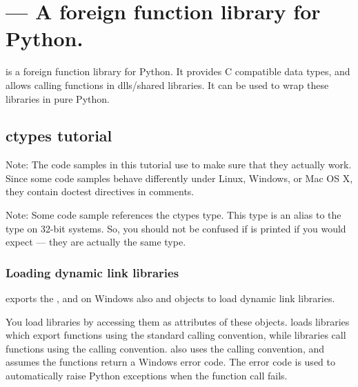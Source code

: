 \ifx\locallinewidth\undefined\newlength{\locallinewidth}\fi
\setlength{\locallinewidth}{\linewidth}
\section{ --- A foreign function library for Python.}

 is a foreign function library for Python.  It provides C
compatible data types, and allows calling functions in dlls/shared
libraries.  It can be used to wrap these libraries in pure Python.


\subsection{ctypes tutorial\label{ctypes-ctypes-tutorial}}

Note: The code samples in this tutorial use  to make sure
that they actually work.  Since some code samples behave differently
under Linux, Windows, or Mac OS X, they contain doctest directives in
comments.

Note: Some code sample references the ctypes  type.
This type is an alias to the  type on 32-bit systems.  So,
you should not be confused if  is printed if you would
expect  --- they are actually the same type.


\subsubsection{Loading dynamic link libraries\label{ctypes-loading-dynamic-link-libraries}}

 exports the , and on Windows also  and
 objects to load dynamic link libraries.

You load libraries by accessing them as attributes of these objects.
 loads libraries which export functions using the standard
 calling convention, while  libraries call
functions using the  calling convention.  also
uses the  calling convention, and assumes the functions
return a Windows  error code. The error code is used to
automatically raise  Python exceptions when the
function call fails.


